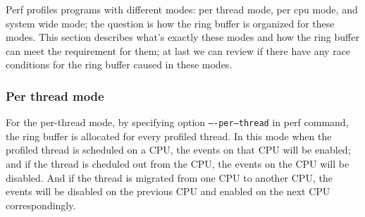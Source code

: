 \documentclass[11pt]{diazessay} %
\def\code#1{\texttt{#1}}
\begin{document}
Perf profiles programs with different modes: per thread mode, per cpu mode, and system wide mode; the question is how the ring buffer is organized for these modes. This section describes what's exactly these modes and how the ring buffer can meet the requirement for them; at last we can review if there have any race conditions for the ring buffer caused in these modes.

\subsubsection*{Per thread mode}

For the per-thread mode, by specifying option \code{----per--thread} in perf command, the ring buffer is allocated for every profiled thread.  In this mode when the profiled thread is scheduled on a CPU, the events on that CPU will be enabled; and if the thread is cheduled out from the CPU, the events on the CPU will be disabled.  And if the thread is migrated from one CPU to another CPU, the events will be disabled on the previous CPU and enabled on the next CPU correspondingly.
\end{document}
